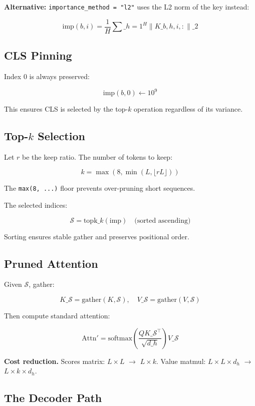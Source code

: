 \textbf{Alternative:} \texttt{importance\_method = "l2"} uses the L2 norm of the key 
instead:

\[
\text{imp}(b, i) = \frac{1}{H} \sum\_{h=1}^{H} \|K\_{b,h,i,:}\|\_2
\tag{4.2}
\]

\subsection{CLS Pinning}

Index 0 is always preserved:

\[
\text{imp}(b, 0) \leftarrow 10^9
\tag{4.3}
\]

This ensures CLS is selected by the top-$k$ operation regardless of its 
variance.

\subsection{Top-$k$ Selection}

Let $r$ be the keep ratio. The number of tokens to keep:

\[
k = \max\!\left(8, \min\!\left(L, \lfloor r L \rfloor\right)\right)
\tag{4.4}
\]

The \texttt{max(8, ...)} floor prevents over-pruning short sequences.

The selected indices:

\[
\mathcal{S} = \text{topk}\_k(\text{imp}) \quad \text{(sorted ascending)}
\tag{4.5}
\]

Sorting ensures stable gather and preserves positional order.

\subsection{Pruned Attention}

Given $\mathcal{S}$, gather:

\[
K\_{\mathcal{S}} = \text{gather}(K, \mathcal{S}), \quad
V\_{\mathcal{S}} = \text{gather}(V, \mathcal{S})
\tag{4.6}
\]

Then compute standard attention:

\[
\text{Attn}' = \text{softmax}\!\left(\frac{Q K\_{\mathcal{S}}^\top}{\sqrt{d\_h}}\right)V\_{\mathcal{S}}
\tag{4.7}
\]

\textbf{Cost reduction.} Scores matrix: $L \times L$ $\to$ $L \times k$. Value matmul: 
$L \times L \times d_h$ $\to$ $L \times k \times d_h$.

\subsection{The Decoder Path}

